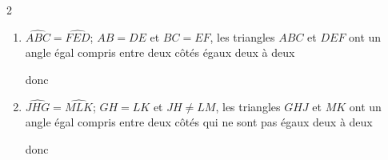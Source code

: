 \begin{corrige}
    \phantom{rrr}    
    \begin{multicols}2
        \begin{enumerate}
            \item $\widehat{ABC}=\widehat{FED}$; $AB=DE$ et $BC=EF$, les triangles $ABC$ et $DEF$ ont
            un angle égal compris entre deux côtés égaux deux à deux
            
            donc 
            \item $\widehat{JHG}=\widehat{MLK}$; $GH=LK$ et $JH\neq LM$, les triangles $GHJ$ et $MK$ ont
            un angle égal compris entre deux côtés qui ne sont pas égaux deux à deux
            
            donc 

        \end{enumerate}
    \end{multicols}
\end{corrige}

